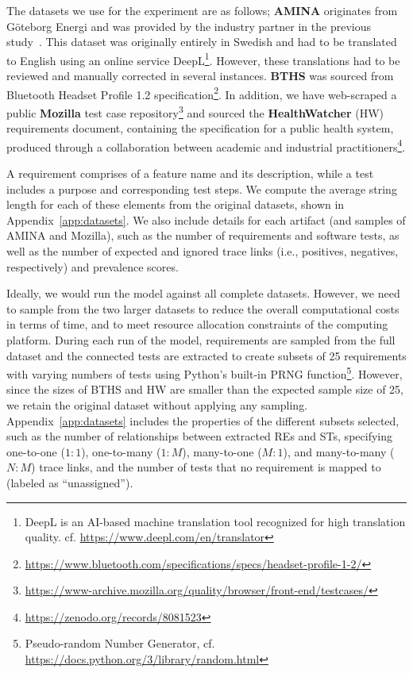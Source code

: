 \documentclass[conference]{IEEEtran}
\begin{document}
The datasets we use for the experiment are as follows; \textbf{AMINA} originates from G\"oteborg Energi and was provided by the industry partner in the previous study~\cite{quinstedt2024Optimizing}. This dataset was originally entirely in Swedish and had to be translated to English using an online service DeepL\footnote{DeepL is an AI-based machine translation tool recognized for high translation quality. cf. \url{https://www.deepl.com/en/translator}}. However, these translations had to be reviewed and manually corrected in several instances. \textbf{BTHS} was sourced from Bluetooth Headset Profile 1.2 specification\footnote{\url{https://www.bluetooth.com/specifications/specs/headset-profile-1-2/}}. In addition, we have web-scraped a public \textbf{Mozilla} test case repository\footnote{\url{https://www-archive.mozilla.org/quality/browser/front-end/testcases/}} and sourced the \textbf{HealthWatcher} (HW) requirements document, containing the specification for a public health system, produced through a collaboration between academic and industrial practitioners\footnote{\url{https://zenodo.org/records/8081523}}.

A requirement comprises of a feature name and its description, while a test includes a purpose and corresponding test steps. We compute the average string length for each of these elements from the original datasets, shown in Appendix~\ref{app:datasets}. We also include details for each artifact (and samples of AMINA and Mozilla), such as the number of requirements and software tests, as well as the number of expected and ignored trace links (i.e., positives, negatives, respectively) and prevalence scores.
 
Ideally, we would run the model against all complete datasets. However, we need to sample from the two larger datasets to reduce the overall computational costs in terms of time, and to meet resource allocation constraints of the computing platform. During each run of the model, requirements are sampled from the full dataset and the connected tests are extracted to create subsets of 25 requirements with varying numbers of tests using Python's built-in PRNG function\footnote{Pseudo-random Number Generator, cf. \url{https://docs.python.org/3/library/random.html}}. However, since the sizes of BTHS and HW are smaller than the expected sample size of 25, we retain the original dataset without applying any sampling. Appendix~\ref{app:datasets} includes the properties of the different subsets selected, such as the number of relationships between extracted REs and STs, specifying one-to-one ($1{:}1$), one-to-many ($1{:}M$), many-to-one ($M{:}1$), and many-to-many ($N{:}M$) trace links, and the number of tests that no requirement is mapped to (labeled as ``unassigned'').
\end{document}
